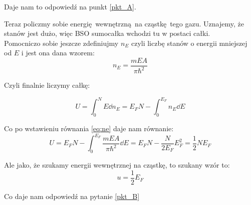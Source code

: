 \documentclass[12pt,a4paper]{article}
\begin{document}
Daje nam to odpowiedź na punkt \ref{pkt_A}.

Teraz policzmy sobie energię wewnętrzną na cząstkę tego gazu. Uznajemy, że stanów jest dużo, więc BSO sumocałka wchodzi tu w postaci całki. \\
Pomocniczo sobie jeszcze zdefiniujmy $n_E$ czyli liczbę stanów o energii mniejszej od $E$ i jest ona dana wzorem:
\begin{equation}\label{eq:ne}
    n_E = \frac{mE A}{\pi \hbar^2}
\end{equation}

Czyli finalnie liczymy całkę:

\[
    U = \int_0^N E \dd{n_E} = E_F N - \int_0^{E_F} n_E \dd{E}
\]

Co po wstawieniu równania \eqref{eq:ne} daje nam równanie:
\[
    U = E_F N - \int_0^{E_F} \frac{m E A}{\pi \hbar^2} \dd{E} = E_F N - \frac{N}{2 E_F} E_F^2 = \frac12 N E_F    
\]

Ale jako, że szukamy energii wewnętrznej na cząstkę, to szukany wzór to:
\[
    u = \frac12 E_F    
\]

Co daje nam odpowiedź na pytanie \ref{pkt_B}
\end{document}
